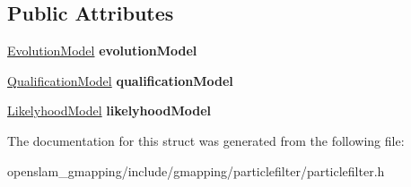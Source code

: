 \subsection*{Public Attributes}
\begin{DoxyCompactItemize}
\item 
\mbox{\label{structauxiliary__evolver_a6376d772526806b776e7ee09e2b70de6}} 
\hyperlink{structEvolutionModel}{Evolution\+Model} {\bfseries evolution\+Model}
\item 
\mbox{\label{structauxiliary__evolver_ad591b97ca5d245ad2bf0c32949bb3788}} 
\hyperlink{structQualificationModel}{Qualification\+Model} {\bfseries qualification\+Model}
\item 
\mbox{\label{structauxiliary__evolver_ab6f7b707a228d6f62a6fc33ad4e77e89}} 
\hyperlink{structLikelyhoodModel}{Likelyhood\+Model} {\bfseries likelyhood\+Model}
\end{DoxyCompactItemize}


The documentation for this struct was generated from the following file\+:\begin{DoxyCompactItemize}
\item 
openslam\+\_\+gmapping/include/gmapping/particlefilter/particlefilter.\+h\end{DoxyCompactItemize}
